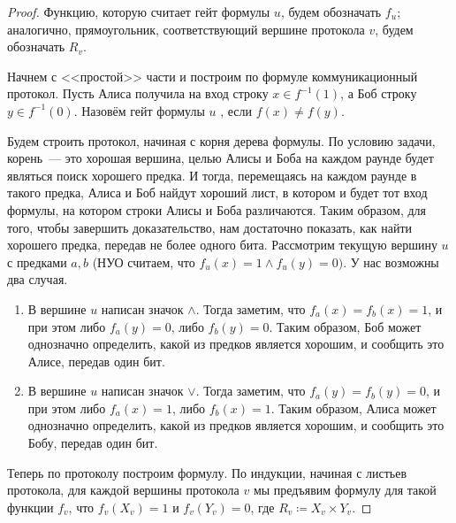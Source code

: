 \begin{proof}
    Функцию, которую считает гейт формулы $u$, будем обозначать $f_u$; аналогично, прямоугольник,
    соответствующий вершине протокола $v$, будем обозначать $R_v$.
    
    Начнем с <<простой>> части и построим по формуле коммуникационный протокол. Пусть Алиса получила на
    вход строку $x \in f^{-1}(1)$, а Боб строку $y \in f^{-1}(0)$. Назовём гейт формулы $u$
    , если $f(x) \neq f(y)$.

    Будем строить протокол, начиная с корня дерева формулы. По условию задачи, корень~--- это хорошая
    вершина, целью Алисы и Боба на каждом раунде будет являться поиск хорошего предка. И тогда,
    перемещаясь на каждом раунде в такого предка, Алиса и Боб найдут хороший лист, в котором и будет тот
    вход формулы, на котором строки Алисы и Боба различаются. Таким образом, для того, чтобы завершить
    доказательство, нам достаточно показать, как найти хорошего предка, передав не более одного
    бита. Рассмотрим текущую вершину $u$ с предками $a, b$ (НУО считаем, что $f_u(x) = 1 \wedge f_u(y) =
    0)$. У нас возможны два случая.
    \begin{enumerate}
        \item В вершине $u$ написан значок $\wedge$. Тогда заметим, что $f_a(x) = f_b(x) = 1$, и при этом
            либо $f_a(y) = 0$, либо $f_b(y) = 0$. Таким образом, Боб может однозначно определить, какой
            из предков является хорошим, и сообщить это Алисе, передав один бит.
        \item В вершине $u$ написан значок $\vee$. Тогда заметим, что $f_a(y) = f_b(y) = 0$, и при этом
            либо $f_a(x) = 1$, либо $f_b(x) = 1$. Таким образом, Алиса может однозначно определить, какой
            из предков является хорошим, и сообщить это Бобу, передав один бит.
    \end{enumerate}


    Теперь по протоколу построим формулу. По индукции, начиная с листьев протокола, для каждой вершины
    протокола $v$ мы предъявим формулу для такой функции $f_v$, что $f_v(X_v) = 1$ и $f_v(Y_v) = 0$,
    где $R_v \coloneqq X_v \times Y_v$.


\end{proof}
